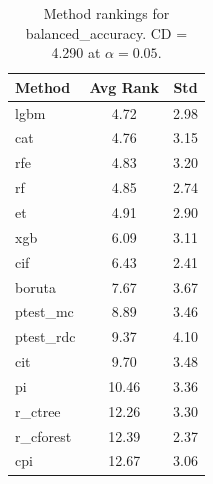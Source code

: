 \begin{table}[h]
\centering
\caption{Method rankings for balanced_accuracy. CD = 4.290 at $\alpha=0.05$.}
\label{tab:ranks_balanced_accuracy}
\begin{tabular}{lcc}
\toprule
Method & Avg Rank & Std \\
\midrule
lgbm & 4.72 & 2.98 \\
cat & 4.76 & 3.15 \\
rfe & 4.83 & 3.20 \\
rf & 4.85 & 2.74 \\
et & 4.91 & 2.90 \\
xgb & 6.09 & 3.11 \\
cif & 6.43 & 2.41 \\
boruta & 7.67 & 3.67 \\
ptest_mc & 8.89 & 3.46 \\
ptest_rdc & 9.37 & 4.10 \\
cit & 9.70 & 3.48 \\
pi & 10.46 & 3.36 \\
r_ctree & 12.26 & 3.30 \\
r_cforest & 12.39 & 2.37 \\
cpi & 12.67 & 3.06 \\
\bottomrule
\end{tabular}
\end{table}
